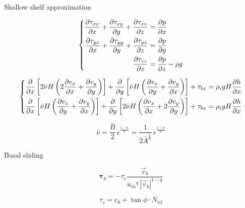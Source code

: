 \documentclass{article}
\begin{document}
Shallow shelf approximation

\begin{equation}
    \left\{\begin{aligned}
        \pdv{\tau_{xx}}{x} + \pdv{\tau_{xy}}{y} + \pdv{\tau_{xz}}{z}
            &= \pdv{p}{x} \\
        \pdv{\tau_{yx}}{x} + \pdv{\tau_{yy}}{y} + \pdv{\tau_{yz}}{z}
            &= \pdv{p}{y} \\
        \pdv{\tau_{zz}}{z} &= \pdv{p}{z} - \rho g
    \end{aligned}\right.
\end{equation}


\begin{equation}
    \left\{\begin{aligned}
        \pdv{x} \left[2\bar{\nu}H
                      \left(2\pdv{v_x}{x} + \pdv{v_y}{y}\right) \right]
            + \pdv{y} \left[\bar{\nu}H
                            \left(\pdv{v_x}{y} + \pdv{v_y}{x}\right) \right]
            + \tau_{bx} &= \rho_i gH \pdv{h}{x} \\
        \pdv{x} \left[\bar{\nu}H
                      \left(\pdv{v_x}{y} + \pdv{v_y}{x}\right) \right]
            + \pdv{y} \left[2\bar{\nu}H
                            \left(\pdv{v_x}{x} + 2\pdv{v_y}{y}\right) \right]
            + \tau_{bx} &= \rho_i gH \pdv{h}{x} \\
    \end{aligned}\right.
\end{equation}

\begin{equation}
    \bar{\nu} = \frac{\bar{B}}{2}\,\dot{\epsilon}^{\frac{1-n}{n}}
              = \frac{1}{2 \bar{A}^{\frac{1}{n}}}\,
                \dot{\epsilon}^{\frac{1-n}{n}}
\end{equation}

Basal sliding

\begin{equation}
    \bm{\tau}_b = -\tau_c \frac{\vec{v}_b}
                               {{u_{th}}^q\,|\vec{v}_b|^{1-q}}
\end{equation}

\begin{equation}
   \tau_c = c_{0} + \tan{\phi}\cdot N_{til}
\end{equation}

\newcommand{\phimin}{\phi_{\mathrm{min}}}
\newcommand{\phimax}{\phi_{\mathrm{max}}}
\newcommand{\bmin}{b_{\mathrm{min}}}
\newcommand{\bmax}{b_{\mathrm{max}}}
\end{document}
